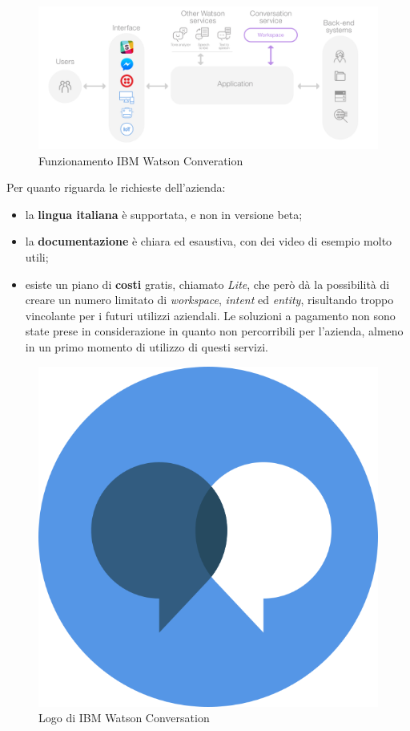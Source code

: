 \begin{figure}[h]
	\centering
	\includegraphics[scale=0.15]{../Immagini/conversation_arch_overview.png}
	\caption{Funzionamento IBM Watson Converation}
\end{figure}

Per quanto riguarda le richieste dell'azienda:
\begin{itemize}
	\item la \textbf{lingua italiana} è supportata, e non in versione beta;
	\item la \textbf{documentazione} è chiara ed esaustiva, con dei video di esempio molto utili;
	\item esiste un piano di \textbf{costi} gratis, chiamato \emph{Lite}, che però dà la possibilità di creare un numero limitato di \emph{workspace}, \emph{intent} ed \emph{entity}, risultando troppo vincolante per i futuri utilizzi aziendali. Le soluzioni a pagamento non sono state prese in considerazione in quanto non percorribili per l'azienda, almeno in un primo momento di utilizzo di questi servizi.
\end{itemize}

\begin{figure}[h]
	\centering
	\includegraphics[scale=0.1]{../Immagini/watson_conversations_icon.png}
	\caption{Logo di IBM Watson Conversation}
\end{figure}

